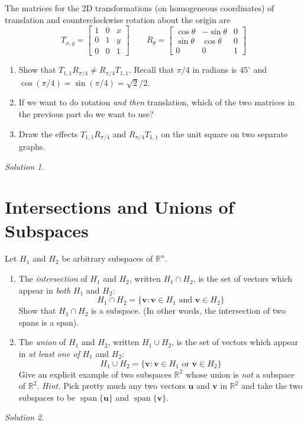 \documentclass{article}
\newcommand{\vv}[1]{\mathbf{#1}}
\newcommand{\R}{\mathbb R}
\DeclareMathOperator{\vspan}{span}
\theoremstyle{remark}
\newtheorem*{solution}{Solution}
\begin{document}
The matrices for the 2D transformations (on homogeneous coordinates) of translation and counterclockwise rotation about the origin are
\begin{displaymath}
  T_{x,y} =
  \begin{bmatrix}
    1 & 0 & x \\
    0 & 1 & y \\
    0 & 0 & 1
  \end{bmatrix}
  \qquad
  R_{\theta} =
  \begin{bmatrix}
    \cos \theta & -\sin \theta & 0 \\
    \sin \theta & \cos \theta & 0 \\
    0 & 0 & 1
  \end{bmatrix}
\end{displaymath}

\begin{enumerate}
\item Show that $T_{1, 1} R_{\pi / 4} \not = R_{\pi / 4} T_{1, 1}$.
  Recall that $\pi / 4$ in radians is $45^\circ$ and $\cos(\pi / 4) = \sin(\pi / 4) = \sqrt{2} / 2$.
\item If we want to do rotation \textit{and then} translation, which of the two matrices in the previous part do we want to use?
\item Draw the effects $T_{1, 1} R_{
  \pi / 4}$ and $R_{\pi / 4} T_{1, 1}$ on the unit square on two separate graphs.
\end{enumerate}

\medskip

\begin{solution}
\end{solution}

\pagebreak
\section{Intersections and Unions of Subspaces}

Let $H_1$ and $H_2$ be arbitrary subspaces of $\R^n$.

\begin{enumerate}
\item The \textit{intersection} of $H_1$ and $H_2$, written $H_1 \cap H_2$, is the set of vectors which appear in \textit{both} $H_1$ and $H_2$:
  \begin{displaymath}
    H_1 \cap H_2 = \{ \vv v : \vv v \in H_1 \text{ and } \vv v \in H_2 \}
  \end{displaymath}
  Show that $H_1 \cap H_2$ is a subspace. (In other words, the intersection of two spans is a span).
\item The \textit{union} of $H_1$ and $H_2$, written $H_1 \cup H_2$, is the set of vectors which appear in \textit{at least one of} $H_1$ and $H_2$:
  \begin{displaymath}
    H_1 \cup H_2 = \{\vv v : \vv v \in H_1 \text{ or } \vv v \in H_2 \}
  \end{displaymath}
  Give an explicit example of two subspaces $\R^2$ whose union is \textit{not} a subspace of $\mathbb R^2$.
  \textit{Hint.} Pick pretty much any two vectors $\vv u$ and $\vv v$ in $\R^2$ and take the two subspaces to be $\vspan\{\vv u\}$ and $\vspan \{ \vv v \}$.
\end{enumerate}

\medskip

\begin{solution}
\end{solution}
\end{document}

